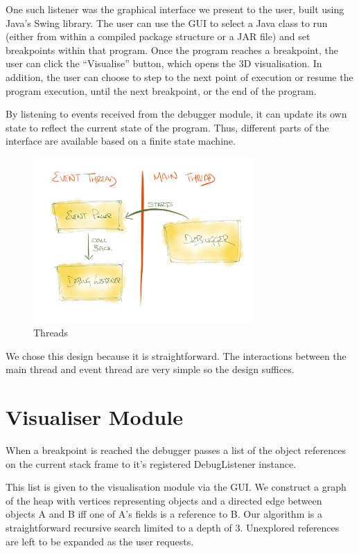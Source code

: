 \documentclass[11pt, a4paper]{report}
\begin{document}
One such listener was the graphical interface we present to the user, built using Java’s Swing library. The user can use the GUI to select a Java class to run (either from within a compiled package structure or a JAR file) and set breakpoints within that program. Once the program reaches a breakpoint, the user can click the “Visualise” button, which opens the 3D visualisation. In addition, the user can choose to step to the next point of execution or resume the program execution, until the next breakpoint, or the end of the program.

By listening to events received from the debugger module, it can update its own state to reflect the current state of the program. Thus, different parts of the interface are available based on a finite state machine.

\begin{figure}[h]
        \centering
        \includegraphics[width=0.75\textwidth]{images/final/thread.png}
        \caption{Threads}
\end{figure}

We chose this design because it is straightforward. The interactions between the main thread and event thread are very simple so the design suffices.

\section{Visualiser Module}

When a breakpoint is reached the debugger passes a list of the object references on the current stack frame to it’s registered DebugListener instance.

This list is given to the visualisation module via the GUI. We construct a graph of the heap with vertices representing objects and a directed edge between objects A and B iff one of A’s fields is a reference to B. Our algorithm is a straightforward recursive search limited to a depth of 3. Unexplored references are left to be expanded as the user requests.
\end{document}
